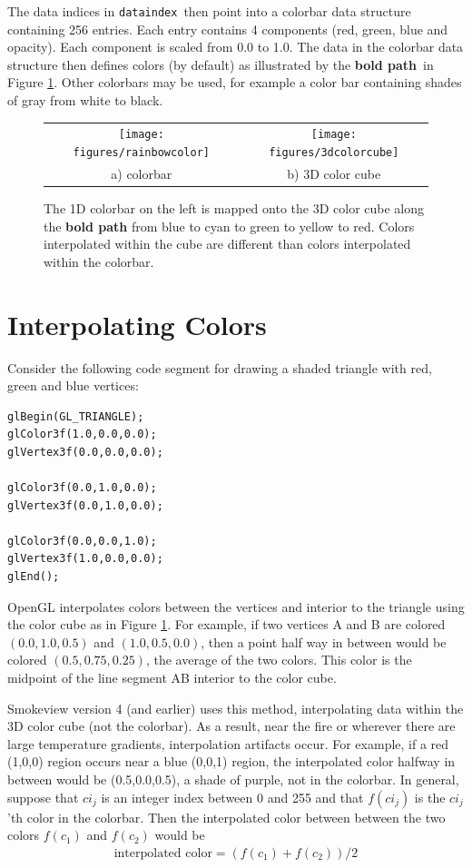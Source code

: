 \documentclass[11pt,twoside]{book}
\newcommand{\figoptions}{P}
\begin{document}
The data indices in {\tt dataindex}\ then point into a colorbar data structure containing 256 entries.  Each entry contains 4 components (red, green, blue and opacity).  Each component is scaled from 0.0 to 1.0.  The data in the colorbar data structure then defines colors (by default) as illustrated by the {\bf bold path}\ in Figure \ref{colorbarinfo}.  Other colorbars may be used, for example a color bar containing shades of gray from white to black.


\begin{figure}[\figoptions]
\begin{center}
\begin{tabular}{cc}
\texttt{[image: figures/rainbowcolor]}&\texttt{[image: figures/3dcolorcube]}\\
a) colorbar&b) 3D color cube\\
\end{tabular}
\end{center}
\caption[1D colorbar and 3D color cube]{The 1D colorbar on the left is mapped onto the 3D color cube
along the {\bf bold path} from blue to cyan to green to yellow to red.  Colors interpolated within the cube are different than colors interpolated within the colorbar.}
\label{colorbarinfo}%
\end{figure}

\section{Interpolating Colors}

Consider the following code segment for drawing a shaded triangle with red, green and blue vertices:
\begin{verbatim}
glBegin(GL_TRIANGLE);
glColor3f(1.0,0.0,0.0);
glVertex3f(0.0,0.0,0.0);

glColor3f(0.0,1.0,0.0);
glVertex3f(0.0,1.0,0.0);

glColor3f(0.0,0.0,1.0);
glVertex3f(1.0,0.0,0.0);
glEnd();
\end{verbatim}

OpenGL interpolates colors between the vertices and interior to the triangle using the color cube as in Figure \ref{colorbarinfo}.  For example, if two vertices A and B are colored $(0.0,1.0,0.5)$ and $(1.0,0.5,0.0)$, then a point half way in between would be colored $(0.5,0.75,0.25)$, the average of the two colors.  This color is the midpoint of the line segment AB interior to the color cube.

Smokeview version 4 (and earlier) uses this method, interpolating data within the 3D color cube (not the colorbar).  As a result, near the fire or wherever there are large temperature gradients, interpolation artifacts occur.  For example, if a red (1,0,0) region occurs near a blue (0,0,1) region, the interpolated color halfway in between would be (0.5,0.0,0.5), a shade of purple, not in the colorbar.  In general, suppose that $ci_j$ is an integer index between 0 and 255 and that $f(ci_j)$ is the $ci_j$'th color in the colorbar.  Then
the interpolated color between between the two colors $f(c_1)$ and $f(c_2)$ would be
\begin{eqnarray*}
\mbox{interpolated color}=(f(c_1)+f(c_2))/2
\end{eqnarray*}
\end{document}
